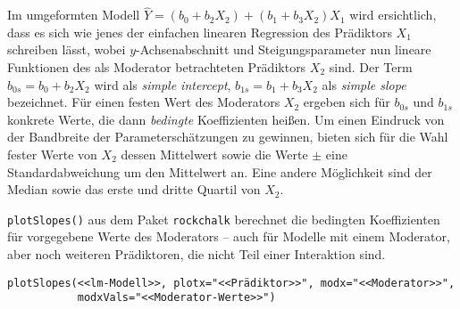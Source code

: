 Im umgeformten Modell $\hat{Y} = (b_{0} + b_{2} X_{2}) + (b_{1} + b_{3} X_{2}) X_{1}$ wird ersichtlich, dass es sich wie jenes der einfachen linearen Regression des Prädiktors $X_{1}$ schreiben lässt, wobei $y$-Achsenabschnitt und Steigungsparameter nun lineare Funktionen des als Moderator betrachteten Prädiktors $X_{2}$ sind. Der Term $b_{0s} = b_{0} + b_{2} X_{2}$ wird als \emph{simple intercept}, $b_{1s} = b_{1} + b_{3} X_{2}$ als \emph{simple slope} bezeichnet. Für einen festen Wert des Moderators $X_{2}$ ergeben sich für $b_{0s}$ und $b_{1s}$ konkrete Werte, die dann \emph{bedingte} Koeffizienten heißen. Um einen Eindruck von der Bandbreite der Parameterschätzungen zu gewinnen, bieten sich für die Wahl fester Werte von $X_{2}$ dessen Mittelwert sowie die Werte $\pm$ eine Standardabweichung um den Mittelwert an. Eine andere Möglichkeit sind der Median sowie das erste und dritte Quartil von $X_{2}$.

\lstinline!plotSlopes()! aus dem Paket \lstinline!rockchalk! \cite{Johnson2013} berechnet die bedingten Koeffizienten für vorgegebene Werte des Moderators -- auch für Modelle mit einem Moderator, aber noch weiteren Prädiktoren, die nicht Teil einer Interaktion sind.
\begin{lstlisting}
plotSlopes(<<lm-Modell>>, plotx="<<Prädiktor>>", modx="<<Moderator>>",
           modxVals="<<Moderator-Werte>>")
\end{lstlisting}

